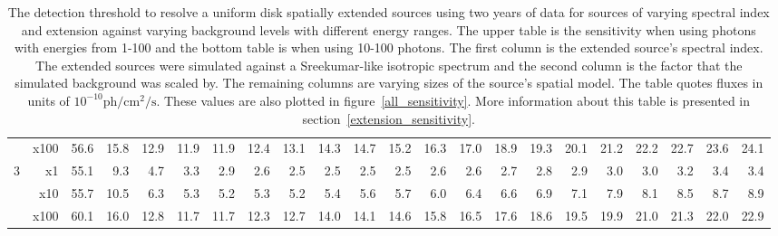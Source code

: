 \documentclass[12pt,preprint]{aastex}
\newcommand{\gev}{\text{GeV}\xspace}
\newcommand{\ph}{\text{ph}\xspace}
\newcommand{\cm}{\text{cm}\xspace}
\renewcommand{\sec}{\text{s}\xspace}
\begin{document}
\begin{appendices}
\begin{table}
\begin{centering}
\begin{tabular}{r|r|rrrrrrrrrrrrrrrrrrrr}
                 &     x100 &       56.6 &       15.8 &       12.9 &       11.9 &       11.9 &       12.4 &       13.1 &       14.3 &       14.7 &       15.2 &       16.3 &       17.0 &       18.9 &       19.3 &       20.1 &       21.2 &       22.2 &       22.7 &       23.6 &       24.1 \\
               3 &       x1 &       55.1 &        9.3 &        4.7 &        3.3 &        2.9 &        2.6 &        2.5 &        2.5 &        2.5 &        2.5 &        2.6 &        2.6 &        2.7 &        2.8 &        2.9 &        3.0 &        3.0 &        3.2 &        3.4 &        3.4 \\
                 &      x10 &       55.7 &       10.5 &        6.3 &        5.3 &        5.2 &        5.3 &        5.2 &        5.4 &        5.6 &        5.7 &        6.0 &        6.4 &        6.6 &        6.9 &        7.1 &        7.9 &        8.1 &        8.5 &        8.7 &        8.9 \\
                 &     x100 &       60.1 &       16.0 &       12.8 &       11.7 &       11.7 &       12.3 &       12.7 &       14.0 &       14.1 &       14.6 &       15.8 &       16.5 &       17.6 &       18.6 &       19.5 &       19.9 &       21.0 &       21.3 &       22.0 &       22.9 \\
        \hline
      \end{tabular}
      \caption{The detection threshold to resolve a uniform disk spatially
      extended sources using two years of data for sources of varying
      spectral index and extension against varying background levels
      with different energy ranges.  The upper table is the sensitivity
      when using photons with energies from 1-100 \gev and the bottom
      table is when using 10-100 \gev photons. The first column is
      the extended source's spectral index.  The extended sources
      were simulated against a Sreekumar-like isotropic spectrum and
      the second column is the factor that the simulated background
      was scaled by. The remaining columns are varying sizes of the
      source's spatial model. The table quotes fluxes in units of
      $10^{-10} \ph/\cm^2/\sec$.  These values are also plotted in
      figure~\ref{all_sensitivity}.  More information about this
      table is presented in section~\ref{extension_sensitivity}.
      }\label{all_sensitivity_table}
    \end{centering}
  \end{table}

\end{appendices}
\end{document}
